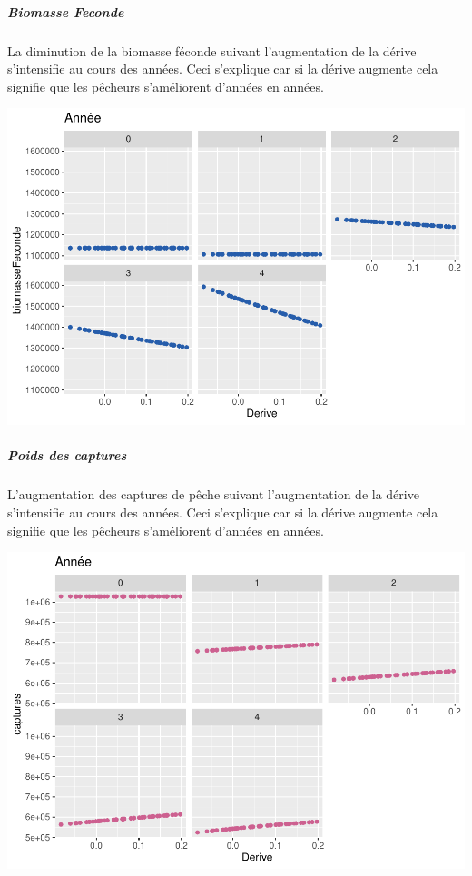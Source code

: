\documentclass[
]{article}
\begin{document}
\hypertarget{biomasse-feconde-1}{%
\subparagraph{Biomasse Feconde}\label{biomasse-feconde-1}}

La diminution de la biomasse féconde suivant l'augmentation de la dérive
s'intensifie au cours des années. Ceci s'explique car si la dérive
augmente cela signifie que les pêcheurs s'améliorent d'années en années.

\includegraphics{rapport_files/figure-latex/ccs-1.pdf}

\hypertarget{poids-des-captures-1}{%
\subparagraph{Poids des captures}\label{poids-des-captures-1}}

L'augmentation des captures de pêche suivant l'augmentation de la dérive
s'intensifie au cours des années. Ceci s'explique car si la dérive
augmente cela signifie que les pêcheurs s'améliorent d'années en années.

\includegraphics{rapport_files/figure-latex/azs-1.pdf}
\end{document}
